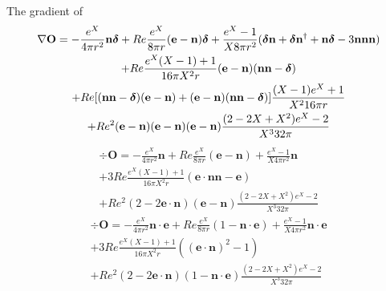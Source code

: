 The gradient of 
\begin{multline}
    \mathbf{\nabla} \textbf{O} =
    - \frac{e^X}{4\pi r^2}\textbf{n} \bm\delta
    + Re\frac{e^X}{8\pi r}(\textbf{e}-\textbf{n})\bm\delta
    + \frac{e^X-1}{X 8 \pi r^2} (\bm\delta \textbf{n}+ \bm\delta \textbf{n}^\dagger + \textbf{n}\bm\delta - 3 \textbf{nnn})  \\
    + Re\frac{e^X(X-1)+1}{16 \pi X^2 r}  (\textbf{e}- \textbf{n})(\textbf{nn} -\bm\delta)\\
    + 
    Re [
        (\textbf{nn} -\bm\delta)
        (\textbf{e} - \textbf{n})
        + 
        (\textbf{e} - \textbf{n})
        (\textbf{nn} -\bm\delta)
        ]
    \frac{(X-1) e^X + 1}{X^2 16 \pi r} \\
    + 
    Re^2 
    (\textbf{e} - \textbf{n})
    (\textbf{e} - \textbf{n})
    (\textbf{e} - \textbf{n})
    \frac{(2-2X +X^2) e^X - 2}{X^3 32 \pi}
\end{multline}
\begin{multline}
    \div\textbf{O} =
    - \frac{e^X}{4\pi r^2}\textbf{n} 
    + Re\frac{e^X}{8\pi r}(\textbf{e}-\textbf{n})
    + \frac{e^X-1}{X 4 \pi r^2} \textbf{n}  \\
    +3 Re\frac{e^X(X-1)+1}{16 \pi X^2 r} (\textbf{e}\cdot \textbf{nn} -\textbf{e})\\
    + 
    Re^2 
    (2 -2 \textbf{e}\cdot \textbf{n})
    (\textbf{e} - \textbf{n})
    \frac{(2-2X +X^2) e^X - 2}{X^3 32 \pi}
\end{multline}
\begin{multline}
    \div\textbf{O} =
    - \frac{e^X}{4\pi r^2}\textbf{n} \cdot \textbf{e}
    + Re\frac{e^X}{8\pi r}(1-\textbf{n}\cdot \textbf{e})
    + \frac{e^X-1}{X 4 \pi r^2} \textbf{n}\cdot \textbf{e}  \\
    +3 Re\frac{e^X(X-1)+1}{16 \pi X^2 r} ((\textbf{e}\cdot \textbf{n})^2 -1)\\
    + 
    Re^2 
    (2 -2 \textbf{e}\cdot \textbf{n})
    (1 - \textbf{n}\cdot \textbf{e})
    \frac{(2-2X +X^2) e^X - 2}{X^3 32 \pi}
\end{multline}
